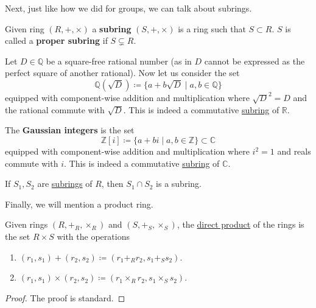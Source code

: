   Next, just like how we did for groups, we can talk about subrings. 

  \begin{definition}[Subring]
    \label{def:subring}
    Given ring $(R, +, \times)$ a \textbf{subring} $(S, +, \times)$ is a ring such that $S \subset R$. $S$ is called a \textbf{proper subring} if $S \subsetneq R$. 
  \end{definition}

  \begin{example}
    \label{ex:quadratic-field}
    Let $D \in \mathbb{Q}$ be a square-free rational number (as in $D$ cannot be expressed as the perfect square of another rational). Now let us consider the set 
    \begin{equation}
      \mathbb{Q} (\sqrt{D}) \coloneqq \{a + b \sqrt{D} \mid a, b \in \mathbb{Q} \}
    \end{equation}
    equipped with component-wise addition and multiplication where $\sqrt{D}^2 = D$ and the rational commute with $\sqrt{D}$. This is indeed a commutative \hyperref[def:subring]{subring} of $\mathbb{R}$. 
  \end{example}

  \begin{example}
    \label{ex:gaussian-integers}
    The \textbf{Gaussian integers} is the set 
    \begin{equation}
      \mathbb{Z}[i] \coloneqq \{a + bi \mid a, b \in \mathbb{Z} \} \subset \mathbb{C}
    \end{equation}
    equipped with component-wise addition and multiplication where $i^2 = 1$ and reals commute with $i$. This is indeed a commutative \hyperref[def:subring]{subring} of $\mathbb{C}$. 
  \end{example}

  \begin{theorem}
    \label{thm:intersections-of-subrings-is-a-subring}
    If $S_1, S_2$ are \hyperref[def:subring]{subrings} of $R$, then $S_1 \cap S_2$ is a subring. 
  \end{theorem}

  Finally, we will mention a product ring. 

  \begin{definition}
    \label{def:direct-product-of-rings}
    Given rings $(R, +_R, \times_R)$ and $(S, +_S, \times_S)$, the \hyperref[def:direct-product]{direct product} of the rings is the set $R \times S$ with the operations 
    \begin{enumerate}
      \item $(r_1, s_1) + (r_2, s_2) \coloneqq (r_1 +_R r_2, s_1 +_S s_2)$. 
      \item $(r_1, s_1) \times (r_2, s_2) \coloneqq (r_1 \times_R r_2, s_1 \times_S s_2)$. 
    \end{enumerate}
  \end{definition}
  \begin{proof}
    The proof is standard. 
  \end{proof}

